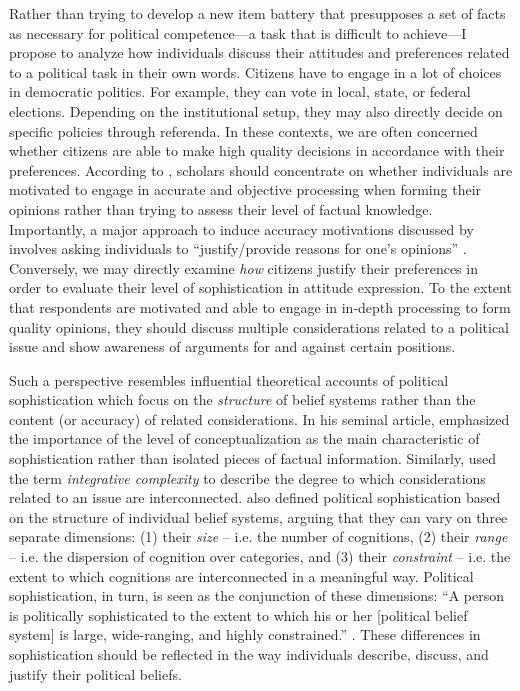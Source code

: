 \documentclass[12pt]{article}
\begin{document}
Rather than trying to develop a new item battery that presupposes a set of facts as necessary for political competence---a task that is difficult to achieve---I propose to analyze how individuals discuss their attitudes and preferences related to a political task in their own words. Citizens have to engage in a lot of choices in democratic politics. For example, they can vote in local, state, or federal elections. Depending on the institutional setup, they may also directly decide on specific policies through referenda. In these contexts, we are often concerned whether citizens are able to make high quality decisions in accordance with their preferences. According to \citet{druckman2014pathologies}, scholars should concentrate on whether individuals are motivated to engage in accurate and objective processing when forming their opinions rather than trying to assess their level of factual knowledge. Importantly, a major approach to induce accuracy motivations discussed by \citet[478]{druckman2014pathologies} involves asking individuals to ``justify/provide reasons for one's opinions'' \citep[see also][]{tetlock1983cognitive,kunda1999motivated,redlawsk2002hot,bolsen2014influence}. Conversely, we may directly examine \textit{how} citizens justify their preferences in order to evaluate their level of sophistication in attitude expression. To the extent that respondents are motivated and able to engage in in-depth processing to form quality opinions, they should discuss multiple considerations related to a political issue and show awareness of arguments for and against certain positions.

Such a perspective resembles influential theoretical accounts of political sophistication which focus on the \textit{structure} of belief systems rather than the content (or accuracy) of related considerations. In his seminal article, \citet{converse1964nature} emphasized the importance of the level of conceptualization as the main characteristic of sophistication rather than isolated pieces of factual information. Similarly, \citet{tetlock1983cognitive} used the term \textsl{integrative complexity} to describe the degree to which considerations related to an issue are interconnected. \citet{luskin1987measuring} also defined political sophistication based on the structure of individual belief systems, arguing that they can vary on three separate dimensions: (1) their \textsl{size} -- i.e. the number of cognitions, (2) their \textsl{range} -- i.e. the dispersion of cognition over categories, and (3) their \textsl{constraint} -- i.e. the extent to which cognitions are interconnected in a meaningful way. Political sophistication, in turn, is seen as the conjunction of these dimensions: ``A person is politically sophisticated to the extent to which his or her [political belief system] is large, wide-ranging, and highly constrained.'' \citep[860]{luskin1987measuring}. These differences in sophistication should be reflected in the way individuals describe, discuss, and justify their political beliefs.
\end{document}
